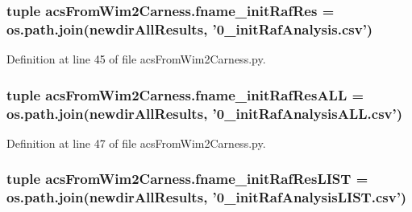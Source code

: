\hypertarget{a00100_a6df9226d812c675c76a936c215c07e53}{
\subsubsection[{fname\-\_\-init\-Raf\-Res}]{\setlength{\rightskip}{0pt plus 5cm}tuple acs\-From\-Wim2\-Carness.\-fname\-\_\-init\-Raf\-Res = os.\-path.\-join({\bf newdir\-All\-Results}, '0\-\_\-init\-Raf\-Analysis.\-csv')}}\label{a00100_a6df9226d812c675c76a936c215c07e53}


Definition at line 45 of file acs\-From\-Wim2\-Carness.\-py.

\hypertarget{a00100_a89c98e628d7938077b4ed18215d4fd9b}{
\subsubsection[{fname\-\_\-init\-Raf\-Res\-A\-L\-L}]{\setlength{\rightskip}{0pt plus 5cm}tuple acs\-From\-Wim2\-Carness.\-fname\-\_\-init\-Raf\-Res\-A\-L\-L = os.\-path.\-join({\bf newdir\-All\-Results}, '0\-\_\-init\-Raf\-Analysis\-A\-L\-L.\-csv')}}\label{a00100_a89c98e628d7938077b4ed18215d4fd9b}


Definition at line 47 of file acs\-From\-Wim2\-Carness.\-py.

\hypertarget{a00100_a69f06c42408f8a1ae74e34daa83402b7}{
\subsubsection[{fname\-\_\-init\-Raf\-Res\-L\-I\-S\-T}]{\setlength{\rightskip}{0pt plus 5cm}tuple acs\-From\-Wim2\-Carness.\-fname\-\_\-init\-Raf\-Res\-L\-I\-S\-T = os.\-path.\-join({\bf newdir\-All\-Results}, '0\-\_\-init\-Raf\-Analysis\-L\-I\-S\-T.\-csv')}}\label{a00100_a69f06c42408f8a1ae74e34daa83402b7}


